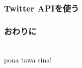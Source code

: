 \documentclass[14pt]{beamer}
\begin{document}
\begin{frame}
	\frametitle{Twitter APIを使う}
\end{frame}

\begin{frame}
	\frametitle{おわりに}

	\begin{center}
		\large
		{\notosans {}}
		\\
		pona tawa sina!
	\end{center}
\end{frame}
\end{document}
